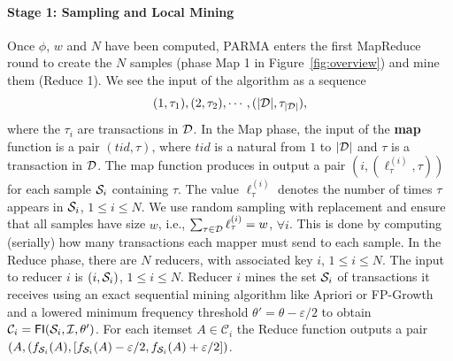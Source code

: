 \paragraph*{Stage 1: Sampling and Local Mining} Once $\phi$, $w$
and $N$ have been computed, PARMA enters the first MapReduce round to create
the $N$ samples (phase Map 1 in Figure~\ref{fig:overview}) and mine them (Reduce 1).
We see the input of the algorithm as a sequence
\[
(1,\tau_1),(2,\tau_2),\cdots,(|{\cal D}|,\tau_{|{\cal D}|}),\]
where the $\tau_i$ are transactions in ${\cal D}$.
In the Map phase, the input of the {\bf map} function is a pair $(tid, \tau)$, where
$tid$ is a natural from $1$ to $|{\cal D}|$ and $\tau$ is a transaction in ${\cal D}$. The
map function produces in output a pair $(i,(\ell^{(i)}_\tau,\tau))$ for each
sample ${\cal S}_i$ containing $\tau$. The value $\ell^{(i)}_\tau$ denotes the
number of times $\tau$ appears in ${\cal S}_i$, $1\le i \le N$. We use random sampling
with replacement and ensure that all samples have size $w$, i.e.,
$\sum_{\tau\in{\cal D}}\ell^{(i)}_\tau=w$, $\forall i$. This is done by computing
(serially) how many transactions each mapper must send to each sample. In the
Reduce phase, there are $N$ reducers, with associated key $i$, $1\le i \le N$.
The input to reducer $i$ is $(i,{\cal S}_i)$, $1\le i\le N$. Reducer $i$ mines the
set ${\cal S}_i$ of transactions it receives using an exact sequential mining
algorithm like Apriori or FP-Growth and a lowered minimum frequency threshold
$\theta'=\theta-\varepsilon/2$ to obtain
$\mathcal{C}_i=\mathsf{FI}({\cal S}_i,{\cal I},\theta')$. For each itemset $A\in\mathcal{C}_i$
the Reduce function outputs a pair $(A,
(f_{{\cal S}_i}(A),[f_{{\cal S}_i}(A)-\varepsilon/2,f_{{\cal S}_i}(A)+\varepsilon/2])$.

